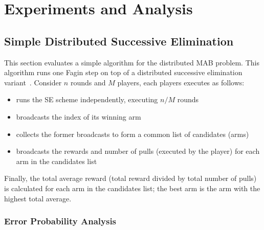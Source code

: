 \documentclass{sig-alternate}
\begin{document}
\newpage
\section{Experiments and Analysis}
\subsection{Simple Distributed Successive Elimination}
This section evaluates a simple algorithm for the distributed MAB problem.
This algorithm runs one Fagin step on top of a distributed successive elimination variant~\cite{Audibert-Bubeck-Munos-COLT2010}. Consider $n$ rounds and $M$ players, each players executes as follows:
\begin{itemize}
\item runs the SE scheme independently, executing $n/M$ rounds
\item broadcasts the index of its winning arm
\item collects the former broadcasts to form a common list of candidates (arms)
\item broadcasts the rewards and number of pulls (executed by the player) for each arm in the candidates list
\end{itemize} 
Finally, the  total average reward (total reward divided by total number of pulls) is calculated for each arm in the candidates list; the best arm is the arm with the highest total average.
 

\subsubsection{Error Probability Analysis}
\end{document}
